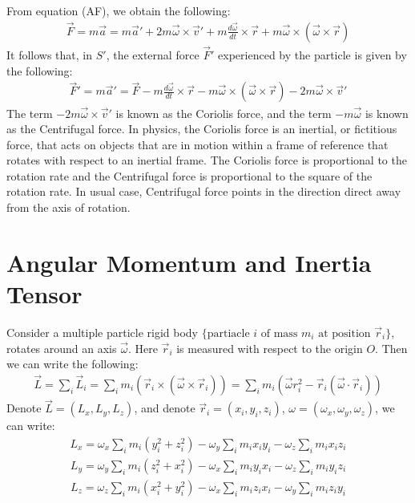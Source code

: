 \documentclass[11pt,oneside]{book}
\theoremstyle{break}
\theoremstyle{break}
\begin{document}
From equation (AF), we obtain the following:
\begin{align*}
\vec{F} = m\vec{a} = m\vec{a}' + 2m\vec{\omega}\times \vec{v}' + m\frac{d\vec{\omega}}{dt} \times \vec{r}+m\vec{\omega }\times (\vec{\omega}\times \vec{r})
\end{align*}
It follows that, in $S'$, the external force $\vec{F}'$ experienced by the particle is given by the following:
\begin{align*}
\vec{F}' = m\vec{a}' = \vec{F} - m \frac{d\vec{\omega}}{dt}\times \vec{r} - m \vec{\omega} \times (\vec{\omega} \times \vec{r}) - 2m \vec{\omega}\times \vec{v}'
\end{align*}
The term $-2m \vec{\omega}\times \vec{v}'$ is known as the Coriolis force, and the term $-m\vec{\omega}$ is known as the Centrifugal force. In physics, the Coriolis force is an inertial, or fictitious force, that acts on objects that are in motion within a frame of reference that rotates with respect to an inertial frame. The Coriolis force is proportional to the rotation rate and the Centrifugal force is proportional to the square of the rotation rate. In usual case, Centrifugal force points in the direction direct away from the axis of rotation. \\
\newpage

\section[Angular Momentum and Inertia Tensor]{\color{red} Angular Momentum and Inertia Tensor\color{black}}
Consider a multiple particle rigid body $\{\text{partiacle }i \text{ of mass }m_i \text{ at position }\vec{r}_i\}$, rotates around an axis $\vec{\omega}$. Here $\vec{r}_i$ is measured with respect to the origin $O$. Then we can write the following:
\begin{align*}
\vec{L} = \sum_i \vec{L}_i = \sum_i m_i \left( \vec{r}_i \times \left(\vec{\omega}\times \vec{r}_i\right)\right) = \sum_i m_i \left( \vec{\omega}r_i^2 - \vec{r}_i \left( \vec{\omega} \cdot \vec{r}_i\right) \right)
\end{align*}
Denote $\vec{L} = (L_x,L_y,L_z)$, and denote $\vec{r}_i = (x_i, y_i, z_i)$, $\omega = (\omega_x, \omega_y,\omega_z)$, we can write:
\begin{align*}
L_x = \omega_x \sum_i m_i (y_i^2 + z_i^2)  - \omega_y \sum_i m_i x_i y_i - \omega_z \sum_i m_i x_i z_i
\end{align*}
\begin{align*}
L_y = \omega_y \sum_i m_i (z_i^2 + x_i^2)  - \omega_x \sum_i m_i y_i x_i - \omega_z \sum_i m_i y_i z_i
\end{align*}
\begin{align*}
L_z = \omega_z \sum_i m_i (x_i^2 + y_i^2)  - \omega_x \sum_i m_i z_i x_i - \omega_y \sum_i m_i z_i y_i
\end{align*}
\end{document}
